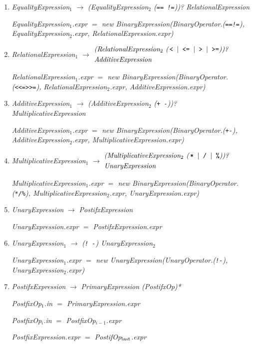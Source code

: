 \documentclass[12pt,a4paper]{scrartcl}
\renewcommand{\prod}[2]{\textit{#1} $\rightarrow$ \textit{#2}}
\newcommand{\tok}[1]{\textnormal{\texttt{#1}}}
\newcommand{\assign}[2]{\textit{#1} $=$ #2}
\newcommand{\new}[2]{\textnormal{new #1(\textit{#2})}}
\newcommand{\attr}[1]{\parbox{\linewidth}{\raggedleft \textit{#1}}}
\begin{document}
\begin{enumerate}
    \item \prod{EqualityExpression$_1$}{(EqualityExpression$_2$ (\tok{== \tor{} !=}))? RelationalExpression}
        \attr{\assign{EqualityExpression$_1$.expr}{\new{BinaryExpression}{BinaryOperator.(\tok{==\tor{}!=}), EqualityExpression$_2$.expr, RelationalExpression.expr}}}
    \item \textit{RelationalExpression}$_1$ $\rightarrow$
        $\begin{aligned}&\textit{(RelationalExpression$_2$ (\tok{< \tor{} <= \tor{} > \tor{} >=}))?}\\
                        &\textit{AdditiveExpression}\end{aligned}$\\
        \attr{\assign{RelationalExpression$_1$.expr}{\new{BinaryExpression}{BinaryOperator.(\tok{<\tor{}<=\tor{}>\tor{}>=}), RelationalExpression$_2$.expr, AdditiveExpression.expr}}}
    \item \prod{AdditiveExpression$_1$}{(AdditiveExpression$_2$ (\tok{+ \tor{} -}))? MultiplicativeExpression}
        \attr{\assign{AdditiveExpression$_1$.expr}{\new{BinaryExpression}{BinaryOperator.(\tok{+\tor{}-}), AdditiveExpression$_2$.expr, MultiplicativeExpression.expr}}}
    \item \textit{MultiplicativeExpression}$_1$ $\rightarrow$
        $\begin{aligned}&\textit{(MultiplicativeExpression$_2$ (\tok{* \tor{} / \tor{} \%}))?}\\
                        &\textit{UnaryExpression}\end{aligned}$\\
        \attr{\assign{MultiplicativeExpression$_1$.expr}{\new{BinaryExpression}{BinaryOperator.(\tok{*\tor{}/\tor{}\%}), MultiplicativeExpression$_2$.expr, UnaryExpression.expr}}}
    \item \prod{UnaryExpression}{PostifxExpression}\\
        \attr{\assign{UnaryExpression.expr}{PostifxExpression.expr}}
    \item \prod{UnaryExpression$_1$}{(\tok{! \tor{} -}) UnaryExpression$_2$}\\
        \attr{\assign{UnaryExpression$_1$.expr}{\new{UnaryExpression}{UnaryOperator.(\tok{!\tor{}-}), UnaryExpression$_2$.expr}}}
    \item \prod{PostifxExpression}{PrimaryExpression (PostifxOp)*}\\
        \attr{\assign{PostfixOp$_1$.in}{PrimaryExpression.expr}}
        \attr{\assign{PostfixOp$_i$.in}{PostfixOp$_{i-1}$.expr}}
        \attr{\assign{PostfixExpression.expr}{PostifOp$_{\textnormal{last}}$.expr}}


\end{enumerate}
\end{document}
